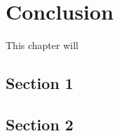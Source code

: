 \chapter[Conclusion]{Conclusion}
\label{cp:conclusion}

{
\parindent0pt
This chapter will \textellipsis
}

\section{Section 1}

\section{Section 2}
